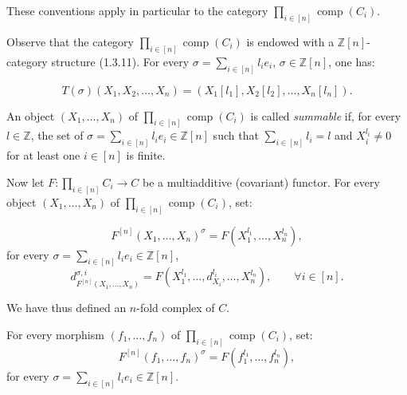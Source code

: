 %
These conventions apply in particular to the category
$\prod_{i\in[n]}\operatorname{comp}(C_i)$.

Observe that the category
$\prod_{i\in[n]}\operatorname{comp}(C_i)$ is endowed with a
$\mathbb Z[n]$-category structure (1.3.11). For every
$\sigma=\sum_{i\in[n]}l_i e_i$, $\sigma\in\mathbb Z[n]$, one has:

\begin{equation}
  T(\sigma)(X_1,X_2,\ldots,X_n)
  = (X_1[l_1],X_2[l_2],\ldots,X_n[l_n]).
  \tag{2.4.2.1}
\end{equation}

An object $(X_1,\ldots,X_n)$ of
$\prod_{i\in[n]}\operatorname{comp}(C_i)$ is called \emph{summable} if,
for every $l\in\mathbb Z$, the set of
$\sigma=\sum_{i\in[n]}l_i e_i\in\mathbb Z[n]$ such that
$\sum_{i\in[n]}l_i=l$ and $X_i^{l_i}\neq0$ for at least one
$i\in[n]$ is finite.

Now let $F\colon\prod_{i\in[n]}C_i\longrightarrow C$ be a multiadditive
(covariant) functor. For every object $(X_1,\ldots,X_n)$ of
$\prod_{i\in[n]}\operatorname{comp}(C_i)$, set:

\begin{equation}
  F^{[n]}(X_1,\ldots,X_n)^\sigma
  =F(X_1^{l_1},\ldots,X_n^{l_n}),
  \tag{2.4.2.2}
\end{equation}
for every $\sigma=\sum_{i\in[n]}l_i e_i\in\mathbb Z[n]$,
\begin{equation*}
  d^{\sigma,i}_{F^{[n]}(X_1,\ldots,X_n)}
  =F(X_1^{l_1},\ldots,d_{X_i}^{l_i},\ldots,X_n^{l_n}),
  \qquad \forall i\in[n].
\end{equation*}

We have thus defined an $n$-fold complex of $C$.

For every morphism $(f_1,\ldots,f_n)$ of
$\prod_{i\in[n]}\operatorname{comp}(C_i)$, set:
\begin{equation}
  F^{[n]}(f_1,\ldots,f_n)^\sigma
  =F(f_1^{l_1},\ldots,f_n^{l_n}),
  \tag{2.4.2.3}
\end{equation}
for every $\sigma=\sum_{i\in[n]}l_i e_i\in\mathbb Z[n]$.

